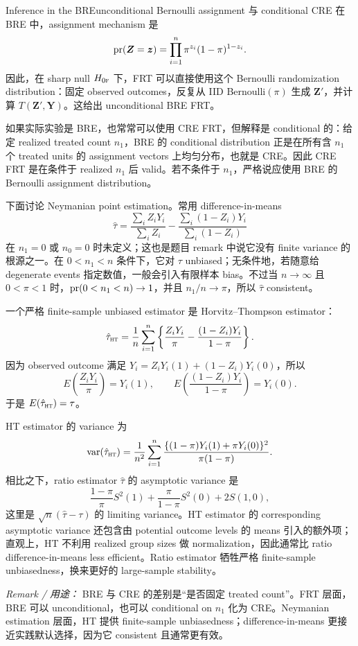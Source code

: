 \begin{exercisesolution}{Inference in the BRE}{unconditional Bernoulli assignment 与 conditional CRE}
在 BRE 中，assignment mechanism 是
\[
\textup{pr}(\boldsymbol Z=\boldsymbol z)
=\prod_{i=1}^n \pi^{z_i}(1-\pi)^{1-z_i}.
\]
因此，在 sharp null $H_{0\textsc{f}}$ 下，FRT 可以直接使用这个 Bernoulli randomization distribution：固定 observed outcomes，反复从 IID Bernoulli$(\pi)$ 生成 $\boldsymbol Z'$，并计算 $T(\boldsymbol Z',\boldsymbol Y)$。这给出 unconditional BRE FRT。

如果实际实验是 BRE，也常常可以使用 CRE FRT，但解释是 conditional 的：给定 realized treated count $n_1$，BRE 的 conditional distribution 正是在所有含 $n_1$ 个 treated units 的 assignment vectors 上均匀分布，也就是 CRE。因此 CRE FRT 是在条件于 realized $n_1$ 后 valid。若不条件于 $n_1$，严格说应使用 BRE 的 Bernoulli assignment distribution。

下面讨论 Neymanian point estimation。常用 difference-in-means
\[
\hat\tau=\frac{\sum_i Z_iY_i}{\sum_i Z_i}
-\frac{\sum_i(1-Z_i)Y_i}{\sum_i(1-Z_i)}
\]
在 $n_1=0$ 或 $n_0=0$ 时未定义；这也是题目 remark 中说它没有 finite variance 的根源之一。在 $0<n_1<n$ 条件下，它对 $\tau$ unbiased；无条件地，若随意给 degenerate events 指定数值，一般会引入有限样本 bias。不过当 $n\to\infty$ 且 $0<\pi<1$ 时，$\textup{pr}(0<n_1<n)\to1$，并且 $n_1/n\to\pi$，所以 $\hat\tau$ consistent。

一个严格 finite-sample unbiased estimator 是 Horvitz--Thompson estimator：
\[
\hat\tau_{\textsc{ht}}
=\frac{1}{n}\sum_{i=1}^n
\left\{
\frac{Z_iY_i}{\pi}
-\frac{(1-Z_i)Y_i}{1-\pi}
\right\}.
\]
因为 observed outcome 满足 $Y_i=Z_iY_i(1)+(1-Z_i)Y_i(0)$，所以
\[
E\left(\frac{Z_iY_i}{\pi}\right)=Y_i(1),\qquad
E\left(\frac{(1-Z_i)Y_i}{1-\pi}\right)=Y_i(0).
\]
于是 $E(\hat\tau_{\textsc{ht}})=\tau$。

HT estimator 的 variance 为
\[
\textup{var}(\hat\tau_{\textsc{ht}})
=\frac{1}{n^2}\sum_{i=1}^n
\frac{\{(1-\pi)Y_i(1)+\pi Y_i(0)\}^2}{\pi(1-\pi)}.
\]
相比之下，ratio estimator $\hat\tau$ 的 asymptotic variance 是
\[
\frac{1-\pi}{\pi}S^2(1)
+\frac{\pi}{1-\pi}S^2(0)
+2S(1,0),
\]
这里是 $\sqrt n(\hat\tau-\tau)$ 的 limiting variance。HT estimator 的 corresponding asymptotic variance 还包含由 potential outcome levels 的 means 引入的额外项；直观上，HT 不利用 realized group sizes 做 normalization，因此通常比 ratio difference-in-means less efficient。Ratio estimator 牺牲严格 finite-sample unbiasedness，换来更好的 large-sample stability。

\emph{Remark / 用途：} BRE 与 CRE 的差别是“是否固定 treated count”。FRT 层面，BRE 可以 unconditional，也可以 conditional on $n_1$ 化为 CRE。Neymanian estimation 层面，HT 提供 finite-sample unbiasedness；difference-in-means 更接近实践默认选择，因为它 consistent 且通常更有效。
\end{exercisesolution}
